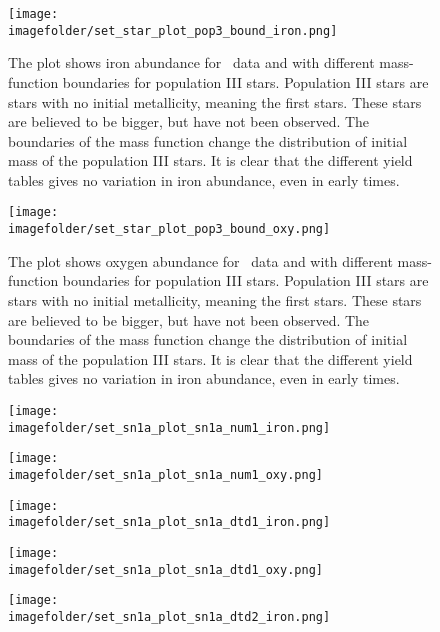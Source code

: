 \begin{figure}[h]
  \centering
  \texttt{[image: \\imagefolder/set\_star\_plot\_pop3\_bound\_iron.png]}
  \caption{\label{fig:fit-v2-pop3-imfb-iron}
    The plot shows iron abundance for \eris\ data and \omegamodel with different mass-function boundaries for population III stars.
    Population III stars are stars with no initial metallicity, meaning the first stars. These stars are believed to be bigger, but have not been observed. The boundaries of the mass function change the distribution of initial mass of the population III stars.
    It is clear that the different yield tables gives no variation in iron abundance, even in early times.
  }
\end{figure}
\begin{figure}[h]
  \centering
  \texttt{[image: \\imagefolder/set\_star\_plot\_pop3\_bound\_oxy.png]}
  \caption{\label{fig:fit-v2-pop3-imfb-oxy}
    The plot shows oxygen abundance for \eris\ data and \omegamodel with different mass-function boundaries for population III stars.
    Population III stars are stars with no initial metallicity, meaning the first stars. These stars are believed to be bigger, but have not been observed. The boundaries of the mass function change the distribution of initial mass of the population III stars.
    It is clear that the different yield tables gives no variation in iron abundance, even in early times.
  }
\end{figure}
\begin{figure}[h]
  \centering
  \texttt{[image: \\imagefolder/set\_sn1a\_plot\_sn1a\_num1\_iron.png]}
\end{figure}
\begin{figure}[h]
  \centering
  \texttt{[image: \\imagefolder/set\_sn1a\_plot\_sn1a\_num1\_oxy.png]}
\end{figure}
\begin{figure}[h]
  \centering
  \texttt{[image: \\imagefolder/set\_sn1a\_plot\_sn1a\_dtd1\_iron.png]}
  \caption{\label{fig:fit-v2-dtd1-iron}}
\end{figure}
\begin{figure}[h]
  \centering
  \texttt{[image: \\imagefolder/set\_sn1a\_plot\_sn1a\_dtd1\_oxy.png]}
\end{figure}
\begin{figure}[h]
  \centering
  \texttt{[image: \\imagefolder/set\_sn1a\_plot\_sn1a\_dtd2\_iron.png]}
\end{figure}
